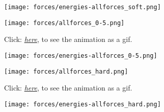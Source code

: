 \begin{figure}
	\begin{center}
		\texttt{[image: forces/energies-allforces\_soft.png]}
		\caption{}
		\label{fig:allEnergies-soft}
	\end{center}
\end{figure}

\begin{figure}[h!]
	\begin{center}
		\texttt{[image: forces/allforces\_0-5.png]}
		\caption{Click: \href{https://github.com/tivo476c/FlexibleCellModel/blob/master/figures/gifs/showForces/show-allForces-hard5e-1.gif}{\textit{here}}, to see the animation as a gif.
		}
		\label{fig:overlapForce}
	\end{center}
\end{figure}

\begin{figure}
	\begin{center}
		\texttt{[image: forces/energies-allforces\_0-5.png]}
		\caption{}
		\label{fig:allEnergies-half}
	\end{center}
\end{figure}

\begin{figure}[h!]
	\begin{center}
		\texttt{[image: forces/allforces\_hard.png]}
		\caption{Click: \href{https://github.com/tivo476c/FlexibleCellModel/blob/master/figures/gifs/showForces/show-allForces-hard.gif}{\textit{here}}, to see the animation as a gif.
		}
		\label{fig:overlapForce}
	\end{center}
\end{figure}

\begin{figure}
	\begin{center}
		\texttt{[image: forces/energies-allforces\_hard.png]}
		\caption{}
		\label{fig:allEnergies-hard}
	\end{center}
\end{figure}